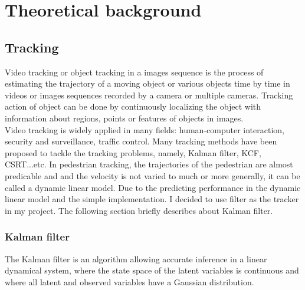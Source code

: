 \chapter{Theoretical background}
\section{Tracking}
Video tracking or object tracking in a images sequence is the process of estimating the trajectory of a moving object or various objects time by time in videos or images sequences recorded by a camera or multiple cameras. Tracking action of object can be done by continuously localizing the object with information about regions, points or features of objects in images.\\
Video tracking is widely applied in many fields: human-computer interaction, security and surveillance, traffic control. Many tracking methods have been proposed to tackle the tracking problems, namely, Kalman filter, KCF, CSRT...etc. In pedestrian tracking, the trajectories of the pedestrian are almost predicable and and the velocity is not varied to much or more generally, it can be called a dynamic linear model. Due to the predicting performance in the dynamic linear model and the simple implementation. I decided to use filter as the tracker in my project. The following section briefly describes about Kalman filter.
\pagebreak
\subsection{Kalman filter}
The Kalman filter is an algorithm allowing accurate inference in a linear dynamical system, where the state space of the latent variables is continuous and where all latent and observed variables have a Gaussian distribution.\cite{Kalman}

